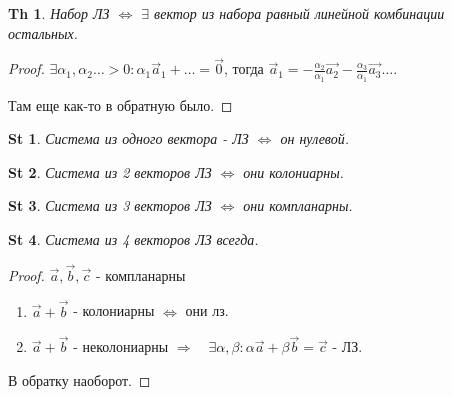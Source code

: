 \documentclass[a5paper, 10pt]{article}
\theoremstyle{plain}
\newtheorem*{theorem}{Th}
\newtheorem*{statement}{St}
\newcommand{\Rarrow}{\Rightarrow}
\newcommand{\Lrarrow}{\Leftrightarrow}
\begin{document}
    \begin{theorem}
    Набор ЛЗ $ \Lrarrow $
    $ \exists $ вектор из набора равный линейной комбинации остальных.
    \end{theorem}

    \begin{proof}
    $ \exists \alpha_1, \alpha_2 \dots > 0:
    \alpha_1 \vec{a}_1 + \dots = \vec{0} $, тогда
    $ \vec{a}_1 =
    - \frac{\alpha_2}{\alpha_1} \vec{a_2}
    - \frac{\alpha_3}{\alpha_1} \vec{a_3}
    \dots $.

    Там еще как-то в обратную было.
    \end{proof}

    \begin{statement}
    Система из одного вектора - ЛЗ $ \Lrarrow $ он нулевой.
    \end{statement}

    \begin{statement}
    Система из 2 векторов ЛЗ $ \Lrarrow $ они колониарны.
    \end{statement}

    \begin{statement}
    Система из 3 векторов ЛЗ $ \Lrarrow $ они компланарны.
    \end{statement}

    \begin{statement}
    Система из 4 векторов ЛЗ всегда.
    \end{statement}

    \begin{proof}
    $ \vec{a}, \vec{b}, \vec{c} $ - компланарны
    \begin{enumerate}
        \item $ \vec{a} + \vec{b} $ - колониарны $ \Lrarrow $ они лз.
        \item $ \vec{a} + \vec{b} $ - неколониарны $ \Rarrow \quad
            \exists \alpha, \beta: \alpha \vec{a} + \beta \vec{b} = \vec{c} $ - ЛЗ.
    \end{enumerate}

    В обратку наоборот.
    \end{proof}
\end{document}
